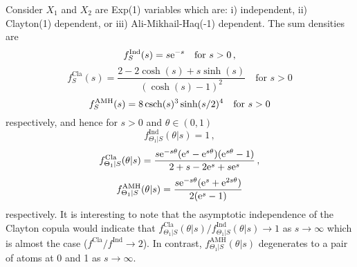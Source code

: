 \begin{example}
Consider $X_1$ and $X_2$ are \textsf{Exp}(1) variables which are: i) independent, ii) \textsf{Clayton}(1) dependent, or iii) \textsf{Ali-Mikhail-Haq}(-1) dependent. The sum densities are
\[ f_S^{\mathrm{Ind}}(s) = s \mathrm{e}^{-s} \quad \text{for } s > 0 \,, \]
\[ f_S^{\mathrm{Cla}}(s) = \frac{2 - 2 \cosh(s) + s \sinh(s)}{(\cosh(s)-1)^2} \quad \text{for } s > 0 \]
\[ f_S^{\mathrm{AMH}}(s) = 8 \operatorname{csch}(s)^3 \sinh(s/2)^4 \quad \text{for } s > 0 \]
respectively, and hence for $s>0$ and $\theta \in (0,1)$
\[ f^{\mathrm{Ind}}_{\Theta_1 | S}(\theta | s) = 1 \,, \]
\[ f^{\mathrm{Cla}}_{\Theta_1 | S}(\theta | s) = \frac{ s \mathrm{e}^{-s \theta}(\mathrm{e}^s - \mathrm{e}^{s \theta})(\mathrm{e}^{s \theta}-1)}{2 + s - 2\mathrm{e}^s + s \mathrm{e}^s} \,, \]
\[ f^{\mathrm{AMH}}_{\Theta_1 | S}(\theta | s) = \frac{ s \mathrm{e}^{-s \theta}(\mathrm{e}^s + \mathrm{e}^{2 s \theta})}{2(\mathrm{e}^s - 1)}  \]
respectively. It is interesting to note that the asymptotic independence of the Clayton copula would indicate that $f^{\mathrm{Cla}}_{\Theta_1 | S}(\theta | s) / f^{\mathrm{Ind}}_{\Theta_1 | S}(\theta | s) \to 1$ as $s\to\infty$ which is almost the case ($f^{\mathrm{Cla}} /  f^{\mathrm{Ind}} \to 2$). In contrast, $f^{\mathrm{AMH}}_{\Theta_1 | S}(\theta | s)$ degenerates to a pair of atoms at 0 and 1 as $s \to \infty$. %
\end{example}





